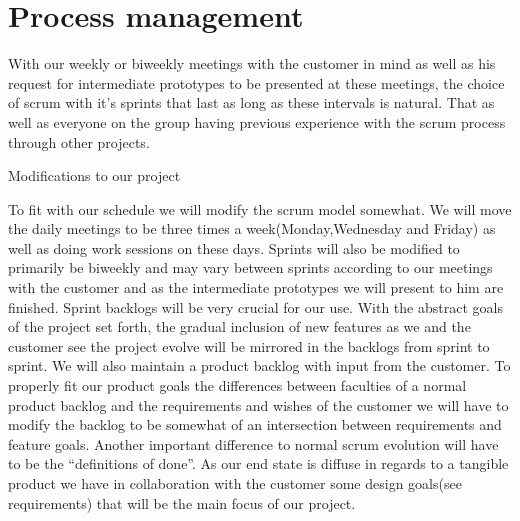 \section{Process management}


With our weekly or biweekly meetings with the customer in mind as well as his request for intermediate prototypes to be presented at these meetings, the choice of scrum with it’s sprints that last as long as these intervals is natural. That as well as everyone on the group having previous experience with the scrum process through other projects.

Modifications to our project


To fit with our schedule we will modify the scrum model somewhat. We will move the daily meetings to be three times a week(Monday,Wednesday and Friday) as well as doing work sessions on these days. Sprints will also be modified to primarily be biweekly and may vary between sprints according to our meetings with the customer and as the intermediate prototypes we will present to him are finished. Sprint backlogs will be very crucial for our use. With the abstract goals of the project set forth, the gradual inclusion of new features as we and the customer see the project evolve will be mirrored in the backlogs from sprint to sprint. We will also maintain a product backlog with input from the customer. To properly fit our product goals the differences between faculties of a normal product backlog and the requirements and wishes of the customer we will have to modify the backlog to be somewhat of an intersection between requirements and feature goals. Another important difference to normal scrum evolution will have to be the “definitions of done”. As our end state is diffuse in regards to a tangible product we have in collaboration with the customer some design goals(see requirements) that will be the main focus of our project.




